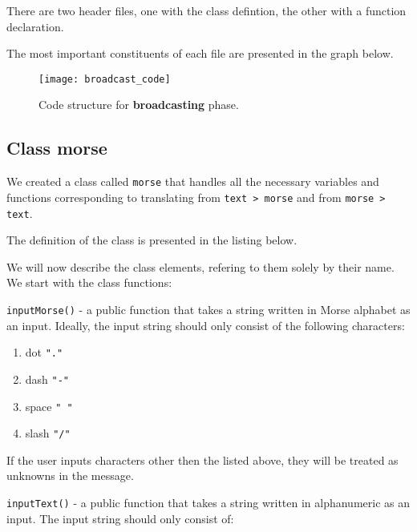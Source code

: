 \documentclass[12pt]{report}
\begin{document}
There are two header files, one with the class defintion, the other with a function declaration.

The most important constituents of each file are presented in the graph below.


\begin{figure}[H]
\centering\texttt{[image: broadcast\_code]}
\caption{Code structure for \textbf{broadcasting} phase.}				
\label{fig:br_code}
\end{figure}





\subsection{Class morse}

We created a class called \verb|morse| that handles all the necessary variables and functions corresponding to translating from \verb|text > morse| and from \verb|morse > text|.

The definition of the class is presented in the listing below.




We will now describe the class elements, refering to them solely by their name. We start with the class functions:

\verb|inputMorse()| - a public function that takes a string written in Morse alphabet as an input. Ideally, the input string should only consist of the following characters:

\begin{enumerate}
\item dot \verb|"."|

\item dash \verb|"-"|

\item space \verb|" "|

\item slash \verb|"/"|
\end{enumerate}

If the user inputs characters other then the listed above, they will be treated as unknowns in the message.




\verb|inputText()| - a public function that takes a string written in alphanumeric as an input. The input string should only consist of:
\end{document}
